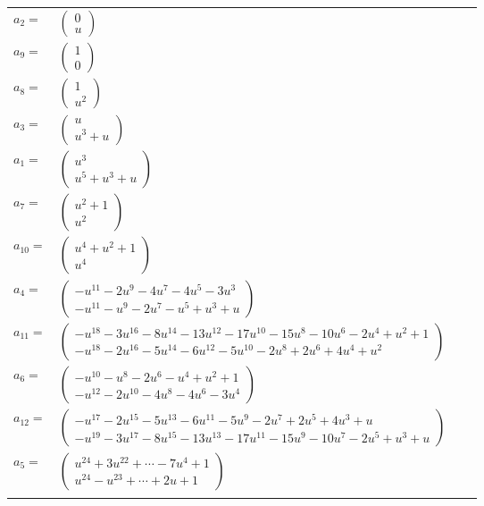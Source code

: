 \documentclass[1p]{elsarticle_modified}
\theoremstyle{definition}
\begin{document}
\begin{tabular}{m{7pt} m{180pt} m{7pt} m{180pt} }
\flushright $a_{2}=$&$\begin{pmatrix}0\\u\end{pmatrix}$ \\
\flushright $a_{9}=$&$\begin{pmatrix}1\\0\end{pmatrix}$ \\
\flushright $a_{8}=$&$\begin{pmatrix}1\\u^2\end{pmatrix}$ \\
\flushright $a_{3}=$&$\begin{pmatrix}u\\u^3+u\end{pmatrix}$ \\
\flushright $a_{1}=$&$\begin{pmatrix}u^3\\u^5+u^3+u\end{pmatrix}$ \\
\flushright $a_{7}=$&$\begin{pmatrix}u^2+1\\u^2\end{pmatrix}$ \\
\flushright $a_{10}=$&$\begin{pmatrix}u^4+u^2+1\\u^4\end{pmatrix}$ \\
\flushright $a_{4}=$&$\begin{pmatrix}- u^{11}-2 u^9-4 u^7-4 u^5-3 u^3\\- u^{11}- u^9-2 u^7- u^5+u^3+u\end{pmatrix}$ \\
\flushright $a_{11}=$&$\begin{pmatrix}- u^{18}-3 u^{16}-8 u^{14}-13 u^{12}-17 u^{10}-15 u^8-10 u^6-2 u^4+u^2+1\\- u^{18}-2 u^{16}-5 u^{14}-6 u^{12}-5 u^{10}-2 u^8+2 u^6+4 u^4+u^2\end{pmatrix}$ \\
\flushright $a_{6}=$&$\begin{pmatrix}- u^{10}- u^8-2 u^6- u^4+u^2+1\\- u^{12}-2 u^{10}-4 u^8-4 u^6-3 u^4\end{pmatrix}$ \\
\flushright $a_{12}=$&$\begin{pmatrix}- u^{17}-2 u^{15}-5 u^{13}-6 u^{11}-5 u^9-2 u^7+2 u^5+4 u^3+u\\- u^{19}-3 u^{17}-8 u^{15}-13 u^{13}-17 u^{11}-15 u^9-10 u^7-2 u^5+u^3+u\end{pmatrix}$ \\
\flushright $a_{5}=$&$\begin{pmatrix}u^{24}+3 u^{22}+\cdots-7 u^4+1\\u^{24}- u^{23}+\cdots+2 u+1\end{pmatrix}$\\&\end{tabular}
\end{document}
